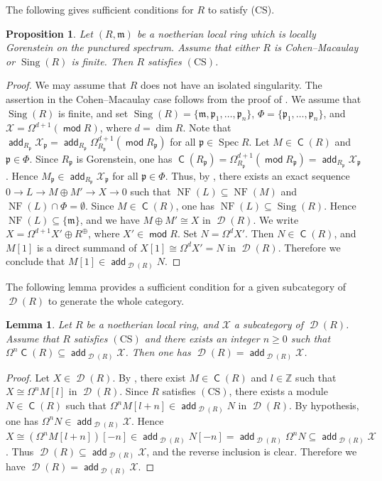 \documentclass[10pt]{amsart}
\newtheorem{lem}[thm]{Lemma}
\newtheorem{prop}[thm]{Proposition}
\theoremstyle{definition}
\theoremstyle{remark}
\numberwithin{equation}{thm}
\def\add{\operatorname{\mathsf{add}}}
\def\c{\operatorname{\mathsf{C}}}
\def\d{\operatorname{\mathscr{D}}}
\def\dim{\operatorname{dim}}
\def\ge{\geqslant}
\def\m{\mathfrak{m}}
\def\mod{\operatorname{\mathsf{mod}}}
\def\NF{\operatorname{NF}}
\def\p{\mathfrak{p}}
\def\Sing{\operatorname{Sing}}
\def\Spec{\operatorname{Spec}}
\def\X{\mathcal{X}}
\def\ZZ{\mathbb{Z}}
\begin{document}
The following gives sufficient conditions for $R$ to satisfy ($\mathrm{CS}$).
\begin{prop}\label{suff_cs}
Let $(R,\m)$ be a noetherian local ring which is locally Gorenstein on the punctured spectrum.
Assume that either $R$ is Cohen--Macaulay or $\Sing(R)$ is finite.
Then $R$ satisfies $(\mathrm{CS})$.
\end{prop}
\begin{proof}
We may assume that $R$ does not have an isolated singularity.
The assertion in the Cohen--Macaulay case follows from the proof of \cite[Remark 4.9]{MT}.
We assume that $\Sing(R)$ is finite, and set $\Sing(R)=\{\m,\p_{1},\ldots,\p_{n}\}$, $\Phi=\{\p_{1},\ldots,\p_{n}\}$, and $\X=\Omega^{d+1}(\mod R)$, where $d=\dim R$.
Note that $\add_{R_{\p}}\X_{\p}=\add_{R_{\p}}\Omega_{R_{\p}}^{d+1}(\mod R_{\p})$ for all $\p\in\Spec R$.
Let $M\in\c(R)$ and $\p\in\Phi$. 
Since $R_{\p}$ is Gorenstein, one has $\c(R_{\p})=\Omega_{R_{\p}}^{d+1}(\mod R_{\p})=\add_{R_{\p}}\X_{\p}$.
Hence $M_{\p}\in\add_{R_{\p}}\X_{\p}$ for all $\p\in\Phi$.
Thus, by \cite[Lemma 3.7(2)]{T2023}, there exists an exact sequence $0\to L\to M\oplus M'\to X\to 0$ such that $\NF(L)\subseteq\NF(M)$ and $\NF(L)\cap\Phi=\emptyset$.
Since $M\in\c(R)$, one has $\NF(L)\subseteq\Sing(R)$.
Hence $\NF(L)\subseteq\{\m\}$, and we have $M\oplus M'\cong X$ in $\d(R)$.
We write $X=\Omega^{d+1}X'\oplus R^{\oplus}$, where $X'\in\mod R$.
Set $N=\Omega^{d}X'$.
Then $N\in\c(R)$, and $M[1]$ is a direct summand of $X[1]\cong \Omega^{d}X'=N$ in $\d(R)$.
Therefore we conclude that $M[1]\in\add_{\d(R)}N$.
\end{proof}
The following lemma provides a sufficient condition for a given subcategory of $\d(R)$ to generate the whole category.
\begin{lem}\label{drgen}
Let $R$ be a noetherian local ring, and $\X$ a subcategory of $\d(R)$. 
Assume that $R$ satisfies $(\mathrm{CS})$ and there exists an integer $n\ge0$ such that $\Omega^{n}\c(R)\subseteq\add_{\d(R)}\X$.
Then one has $\d(R)=\add_{\d(R)}\X$.
\end{lem}
\begin{proof}
Let $X\in\d(R)$.
By \cite[Lemma 2.4(2)]{DT2015b}, there exist $M\in\c(R)$ and $l\in\ZZ$ such that $X\cong\Omega^{n}M[l]$ in $\d(R)$.
Since $R$ satisfies $(\mathrm{CS})$, there exists a module $N\in\c(R)$ such that $\Omega^{n}M[l+n]\in\add_{\d(R)}N$ in $\d(R)$.
By hypothesis, one has $\Omega^{n}N\in\add_{\d(R)}\X$.
Hence $X\cong(\Omega^{n}M[l+n])[-n]\in\add_{\d(R)}N[-n]=\add_{\d(R)}\Omega^{n}N\subseteq \add_{\d(R)}\X$.
Thus $\d(R)\subseteq\add_{\d(R)}\X$, and the reverse inclusion is clear.
Therefore we have $\d(R)=\add_{\d(R)}\X$.
\end{proof}
\end{document}
